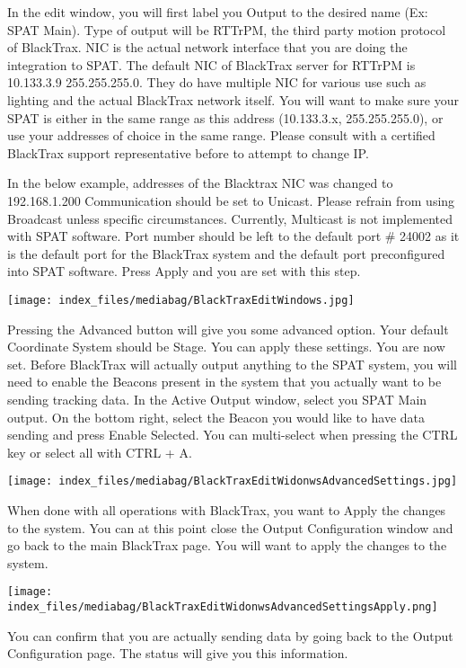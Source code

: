 \documentclass[
  letterpaper,
  DIV=11,
  numbers=noendperiod]{scrreport}
\begin{document}
In the edit window, you will first label you Output to the desired name
(Ex: SPAT Main). Type of output will be RTTrPM, the third party motion
protocol of BlackTrax. NIC is the actual network interface that you are
doing the integration to SPAT. The default NIC of BlackTrax server for
RTTrPM is 10.133.3.9 255.255.255.0. They do have multiple NIC for
various use such as lighting and the actual BlackTrax network itself.
You will want to make sure your SPAT is either in the same range as this
address (10.133.3.x, 255.255.255.0), or use your addresses of choice in
the same range. Please consult with a certified BlackTrax support
representative before to attempt to change IP.

In the below example, addresses of the Blacktrax NIC was changed to
192.168.1.200 Communication should be set to Unicast. Please refrain
from using Broadcast unless specific circumstances. Currently, Multicast
is not implemented with SPAT software. Port number should be left to the
default port \# 24002 as it is the default port for the BlackTrax system
and the default port preconfigured into SPAT software. Press Apply and
you are set with this step.

\texttt{[image: index\_files/mediabag/BlackTraxEditWindows.jpg]}

Pressing the Advanced button will give you some advanced option. Your
default Coordinate System should be Stage. You can apply these settings.
You are now set. Before BlackTrax will actually output anything to the
SPAT system, you will need to enable the Beacons present in the system
that you actually want to be sending tracking data. In the Active Output
window, select you SPAT Main output. On the bottom right, select the
Beacon you would like to have data sending and press Enable Selected.
You can multi-select when pressing the CTRL key or select all with CTRL
+ A.

\texttt{[image: index\_files/mediabag/BlackTraxEditWidonwsAdvancedSettings.jpg]}

When done with all operations with BlackTrax, you want to Apply the
changes to the system. You can at this point close the Output
Configuration window and go back to the main BlackTrax page. You will
want to apply the changes to the system.

\texttt{[image: index\_files/mediabag/BlackTraxEditWidonwsAdvancedSettingsApply.png]}

You can confirm that you are actually sending data by going back to the
Output Configuration page. The status will give you this information.
\end{document}
